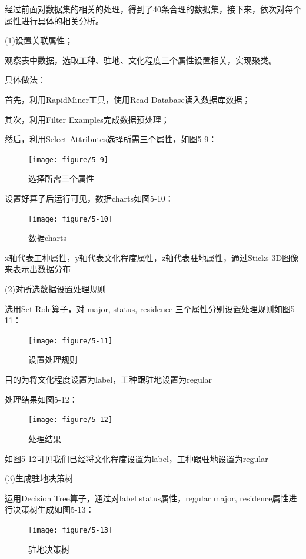 经过前面对数据集的相关的处理，得到了40条合理的数据集，接下来，依次对每个属性进行具体的相关分析。

(1)设置关联属性；

观察表中数据，选取工种、驻地、文化程度三个属性设置相关，实现聚类。

具体做法：

首先，利用RapidMiner工具，使用Read Database读入数据库数据；

其次，利用Filter Examples完成数据预处理；

然后，利用Select Attributes选择所需三个属性，如图5-9：

\begin{figure}[thbp!]
	\centering
	\texttt{[image: figure/5-9]}
	\caption{选择所需三个属性}
	\label{fig:5-9}
\end{figure}

设置好算子后运行可见，数据charts如图5-10：

\begin{figure}[thbp!]
	\centering
	\texttt{[image: figure/5-10]}
	\caption{数据charts}
	\label{fig:5-10}
\end{figure}

x轴代表工种属性，y轴代表文化程度属性，z轴代表驻地属性，通过Sticks 3D图像来表示出数据分布

(2)对所选数据设置处理规则

选用Set Role算子，对 major, status, residence 三个属性分别设置处理规则如图5-11：

\begin{figure}[thbp!]
	\centering
	\texttt{[image: figure/5-11]}
	\caption{设置处理规则}
	\label{fig:5-11}
\end{figure}

目的为将文化程度设置为label，工种跟驻地设置为regular

处理结果如图5-12：

\begin{figure}[thbp!]
	\centering
	\texttt{[image: figure/5-12]}
	\caption{处理结果}
	\label{fig:5-12}
\end{figure}

如图5-12可见我们已经将文化程度设置为label，工种跟驻地设置为regular

(3)生成驻地决策树

运用Decision Tree算子，通过对label status属性，regular major, residence属性进行决策树生成如图5-13：

\begin{figure}[thbp!]
	\centering
	\texttt{[image: figure/5-13]}
	\caption{驻地决策树}
	\label{fig:5-13}
\end{figure}

